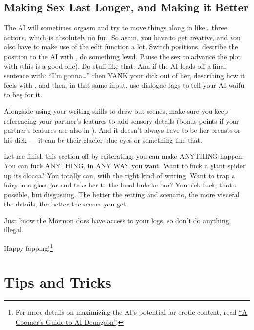 \documentclass[Avsfag-main.tex]{subfiles}
\begin{document}
\subsection{Making Sex Last Longer, and Making it Better}

The AI will sometimes orgasm and try to move things along in like… three actions, which is absolutely no fun.
So again, you have to get creative, and you also have to make use of the edit function a lot.
Switch positions, describe the position to the AI with \story, do something lewd.
Pause the sex to advance the plot with \say (this is a good one).
Do stuff like that.
And if the AI leads off a final sentence with: ``I'm gonna…'' then YANK your dick out of her, describing how it feels with \story, and then, in that same \story input, use dialogue tags to tell your AI waifu to beg for it.

Alongside using your writing skills to draw out scenes, make sure you keep referencing your partner's features to add sensory details (bonus points if your partner's features are also in \wi).
And it doesn't always have to be her breasts or his dick --- it can be their glacier-blue eyes or something like that.

Let me finish this section off by reiterating: you can make ANYTHING happen.
You can fuck ANYTHING, in ANY WAY you want.
Want to fuck a giant spider up its cloaca?
You totally can, with the right kind of writing.
Want to trap a fairy in a glass jar and take her to the local bukake bar?
You sick fuck, that's possible, but disgusting.
The better the setting and scenario, the more visceral the details, the better the scenes you get.

Just know the Mormon does have access to your logs, so don't do anything
illegal.

Happy fapping!\footnote{For more details on maximizing the AI's potential for erotic content, read \href{https://guide.aidg.club/}{``A Coomer's Guide to AI Deungeon''}.}

\section{Tips and Tricks}
\label{sec:tips}
\end{document}

